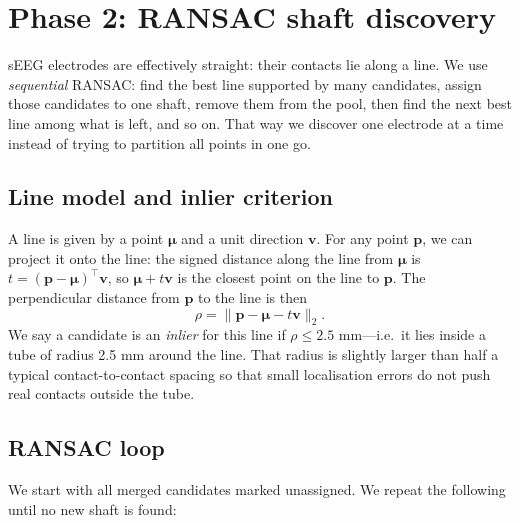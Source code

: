 \documentclass[11pt,a4paper]{article}
\newcommand{\vp}{\mathbf{p}}
\newcommand{\vm}{\boldsymbol{\mu}}
\newcommand{\vv}{\mathbf{v}}
\begin{document}
\section{Phase 2: RANSAC shaft discovery}
\label{sec:phase2}

sEEG electrodes are effectively straight: their contacts lie along a line. We use \emph{sequential} RANSAC: find the best line supported by many candidates, assign those candidates to one shaft, remove them from the pool, then find the next best line among what is left, and so on. That way we discover one electrode at a time instead of trying to partition all points in one go.

\subsection{Line model and inlier criterion}
A line is given by a point \(\vm\) and a unit direction \(\vv\). For any point \(\vp\), we can project it onto the line: the signed distance along the line from \(\vm\) is \(t = (\vp - \vm)^\top \vv\), so \(\vm + t\vv\) is the closest point on the line to \(\vp\). The perpendicular distance from \(\vp\) to the line is then
\[
\rho = \bigl\| \vp - \vm - t\vv \bigr\|_2.
\]
We say a candidate is an \emph{inlier} for this line if \(\rho \leq 2.5\) mm---i.e.\ it lies inside a tube of radius 2.5 mm around the line. That radius is slightly larger than half a typical contact-to-contact spacing so that small localisation errors do not push real contacts outside the tube.

\subsection{RANSAC loop}
We start with all merged candidates marked unassigned. We repeat the following until no new shaft is found:
\end{document}
